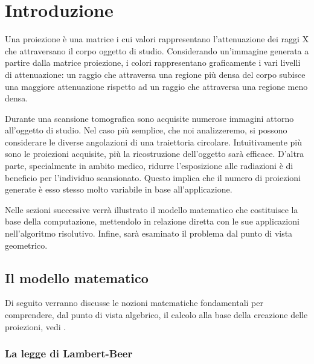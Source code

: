 \documentclass[12pt,a4paper]{report}
\begin{document}
\pagestyle{fancy}
\tableofcontents
\clearpage

\pagestyle{fancy}
\newpage
{}

\chapter{Introduzione}

Una proiezione è una matrice i cui valori rappresentano l'attenuazione dei raggi X che attraversano il corpo oggetto di studio.
Considerando un'immagine generata a partire dalla matrice proiezione, i colori rappresentano graficamente i vari livelli di
attenuazione: un raggio che attraversa una regione più densa del corpo subisce una maggiore attenuazione rispetto ad un
raggio che attraversa una regione meno densa.

Durante una scansione tomografica sono acquisite numerose immagini attorno all'oggetto di studio.
Nel caso più semplice, che noi analizzeremo, si possono considerare le diverse angolazioni di una traiettoria circolare.
Intuitivamente più sono le proiezioni acquisite, più la ricostruzione dell'oggetto sarà efficace.
D'altra parte, specialmente in ambito medico, ridurre l'esposizione alle radiazioni è di beneficio per l'individuo scansionato.
Questo implica che il numero di proiezioni generate è esso stesso molto variabile in base all'applicazione.

Nelle sezioni successive verrà illustrato il modello matematico che costituisce la base della computazione, mettendolo in
relazione diretta con le sue applicazioni nell'algoritmo risolutivo.
Infine, sarà esaminato il problema dal punto di vista geometrico.

\section{Il modello matematico}

Di seguito verranno discusse le nozioni matematiche fondamentali per comprendere, dal punto di vista algebrico, il calcolo
alla base della creazione delle proiezioni, vedi \cite{MoroLoli2021}.

\subsection{La legge di Lambert-Beer}
\end{document}
